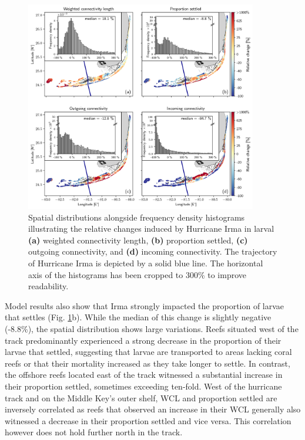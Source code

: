 \documentclass[fleqn,10pt]{wlscirep}
\begin{document}
\begin{figure}[tbp]
    \centering
    \includegraphics[width=0.9\textwidth]{figures/fig_connex_coral.png}
    \caption{Spatial distributions alongside frequency density histograms illustrating the relative changes induced by Hurricane Irma in larval \textbf{(a)} weighted connectivity length, \textbf{(b)} proportion settled, \textbf{(c)} outgoing connectivity, and \textbf{(d)} incoming connectivity. The trajectory of Hurricane Irma is depicted by a solid blue line. The horizontal axis of the histograms has been cropped to 300\% to improve readability.}
    \label{fig:Larvae}
\end{figure}

Model results also show that Irma strongly impacted the proportion of larvae that settles (Fig. \ref{fig:Larvae}b). While the median of this change is slightly negative (-8.8\%), the spatial distribution shows large variations. Reefs situated west of the track predominantly experienced a strong decrease in the proportion of their larvae that settled, suggesting that larvae are transported to areas lacking coral reefs or that their mortality increased as they take longer to settle. In contrast, the offshore reefs located east of the track witnessed a substantial increase in their proportion settled, sometimes exceeding ten-fold. West of the hurricane track and on the Middle Key's outer shelf, WCL and proportion settled are inversely correlated as reefs that observed an increase in their WCL generally also witnessed a decrease in their proportion settled and vice versa. This correlation however does not hold further north in the track.
\end{document}
